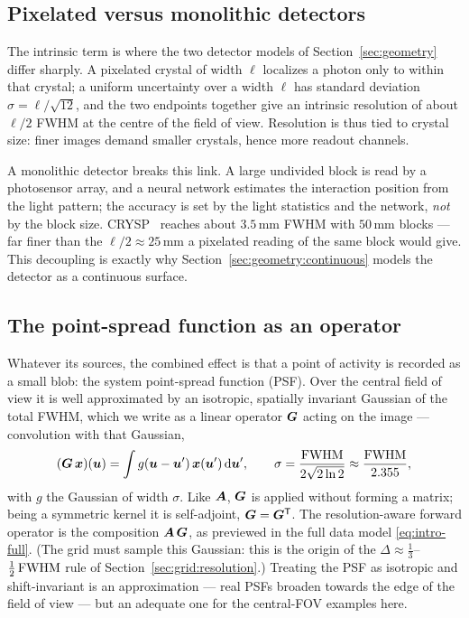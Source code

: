 \subsection{Pixelated versus monolithic detectors}
\label{sec:resolution:detectors}

The intrinsic term is where the two detector models of
Section~\ref{sec:geometry} differ sharply. A pixelated crystal of width $\ell$
localizes a photon only to within that crystal; a uniform uncertainty over a
width $\ell$ has standard deviation $\sigma=\ell/\sqrt{12}$, and the two
endpoints together give an intrinsic resolution of about $\ell/2$ FWHM at the
centre of the field of view. Resolution is thus tied to crystal size: finer
images demand smaller crystals, hence more readout channels.

A monolithic detector breaks this link. A large undivided block is read by a
photosensor array, and a neural network estimates the interaction position from
the light pattern; the accuracy is set by the light statistics and the network,
\emph{not} by the block size. CRYSP~\cite{crysp2026} reaches about
$3.5\,\mathrm{mm}$ FWHM with $50\,\mathrm{mm}$ blocks --- far finer than the
$\ell/2\approx25\,\mathrm{mm}$ a pixelated reading of the same block would give.
This decoupling is exactly why Section~\ref{sec:geometry:continuous} models the
detector as a continuous surface.

\subsection{The point-spread function as an operator}
\label{sec:resolution:psf}

Whatever its sources, the combined effect is that a point of activity is
recorded as a small blob: the system point-spread function (PSF). Over the
central field of view it is well approximated by an isotropic, spatially
invariant Gaussian of the total FWHM, which we write as a linear operator
$\bm{G}$ acting on the image --- convolution with that Gaussian,
\begin{equation}
  (\bm{G}\,\bm{x})(\bm u) = \int g(\bm u-\bm u')\,\bm{x}(\bm u')\,\mathrm{d}\bm u' ,
  \qquad
  \sigma = \frac{\mathrm{FWHM}}{2\sqrt{2\ln 2}} \approx \frac{\mathrm{FWHM}}{2.355} ,
  \label{eq:res-gaussian}
\end{equation}
with $g$ the Gaussian of width $\sigma$. Like $\bm{A}$, $\bm{G}$ is applied without
forming a matrix; being a symmetric kernel it is self-adjoint, $\bm{G}=\bm{G}^{\mathsf T}$.
The resolution-aware forward operator is the composition $\bm{A}\,\bm{G}$, as
previewed in the full data model \eqref{eq:intro-full}. (The grid must sample
this Gaussian: this is the origin of the $\Delta\approx\tfrac13$--$\tfrac12\,\mathrm{FWHM}$
rule of Section~\ref{sec:grid:resolution}.) Treating the PSF as isotropic and
shift-invariant is an approximation --- real PSFs broaden towards the edge of
the field of view --- but an adequate one for the central-FOV examples here.

